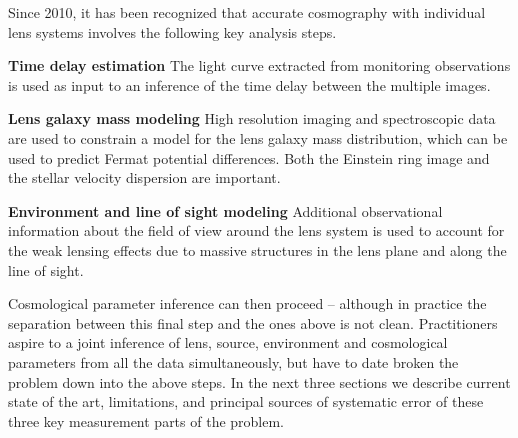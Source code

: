 Since 2010, it has been recognized that accurate cosmography with
individual lens systems involves the following key analysis steps.

\begin{description}
    \item{\bf Time delay estimation} The light curve extracted from
    monitoring observations is used as input to an inference of the
    time delay between the multiple images.
    \item{\bf Lens galaxy mass modeling} High resolution imaging
    and spectroscopic data are used to
    constrain a model for the lens galaxy mass distribution, which can be used
    to predict Fermat potential differences. Both the Einstein ring
    image and the stellar velocity dispersion are important.
    \item{\bf Environment and line of sight modeling} Additional observational
    information about the field of view around the lens system is used
    to account for the weak lensing effects due to massive structures in
    the lens plane and along the line of sight.
\end{description}

Cosmological parameter inference can then proceed -- although in
practice the  separation between this final step and the ones above is
not clean. Practitioners aspire to a joint inference of lens, source,
environment and cosmological parameters from all the data
simultaneously, but have to date broken the problem down  into the above
steps. In the next three sections we describe current state of the art,
limitations, and principal sources of systematic error of these three
key measurement parts of the problem.
